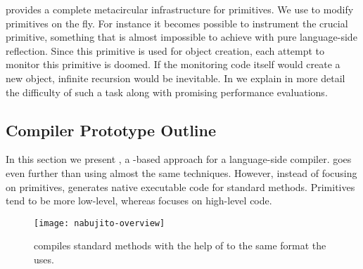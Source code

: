 \WF provides a complete metacircular infrastructure for primitives.
We use \WF to modify primitives on the fly.
For instance it becomes possible to instrument the crucial  primitive, something that is almost impossible to achieve with pure language-side reflection.
Since this primitive is used for object creation, each attempt to monitor this primitive is doomed.
If the monitoring code itself would create a new object, infinite recursion would be inevitable.
In  we explain in more detail the difficulty of such a task along with promising performance evaluations.



\subsection{\NBJ \JIT Compiler Prototype Outline}
In this section we present \NBJ, a \B-based approach for a language-side \JIT compiler.
\NBJ goes even further than \WF using almost the same techniques.
However, instead of focusing on primitives, \NBJ generates native executable code for standard \PH methods.
Primitives tend to be more low-level, whereas \NBJ focuses on high-level \PH code. 

\begin{figure}[h]
	\centering
	\texttt{[image: nabujito-overview]}
	\caption[\NBJ Overview]{\NBJ compiles standard \PH methods with the help of \B to the same format the \VM \JIT uses.}
\end{figure}

